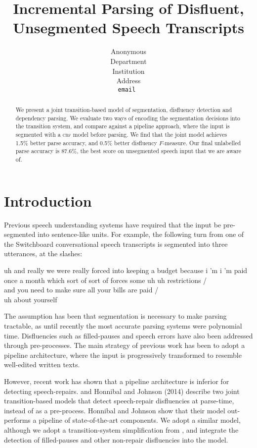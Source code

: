 \documentclass[11pt,letterpaper]{article}
\title{Incremental Parsing of Disfluent, Unsegmented Speech Transcripts}
\author{
	Anonymous\\
  	Department\\
  	Institution\\
  	Address\\
  {\tt \small email }\\
}
\date{}
\begin{document}
\maketitle
\begin{abstract}
We present a joint transition-based model of segmentation, disfluency detection
and dependency parsing.  We evaluate two ways of encoding the segmentation
decisions into the transition system, and compare against a pipeline approach,
where the input is segmented with a \textsc{crf} model before parsing.
We find that the joint model achieves 1.5\% better parse accuracy, and 0.5\% better
disfluency $F$-measure.
Our final unlabelled parse accuracy is 87.6\%, the best score on
unsegmented speech input that we are aware of.
\end{abstract}

\section{Introduction}

Previous speech understanding systems have required that the input be
pre-segmented into sentence-like units. 
For example, the following turn from one of the Switchboard conversational speech
transcripts is segmented into three utterances, at the slashes:

\begin{lexample}
\small
uh and really we were really forced into keeping a budget because i 'm i 'm paid once a month which sort of sort of forces some uh uh restrictions / \\
and you need to make sure all your bills are paid / \\
uh about yourself
\end{lexample}

\noindent 
The assumption has been that segmentation
is necessary to make parsing tractable, as until recently the most accurate parsing
systems were polynomial time.  Disfluencies such as filled-pauses and speech
errors have also been addressed through pre-processes.
The main strategy of previous work has been to adopt a pipeline
architecture, where the input is progressively transformed to resemble well-edited
written texts.

However, recent work has shown that a pipeline architecture is inferior for detecting
speech-repairs.  \citet{rasooli:13} and Honnibal and Johnson (2014)
describe two joint
transition-based models that detect speech-repair disfluencies at parse-time,
instead of as a pre-process.  Honnibal and Johnson show that their model out-performs
a pipeline of state-of-the-art components.  We adopt a similar model, although
we adopt a transition-system simplification from \citet{kuhlmann:11}, and integrate
the detection of filled-pauses and other non-repair disfluencies into the model.
\end{document}
